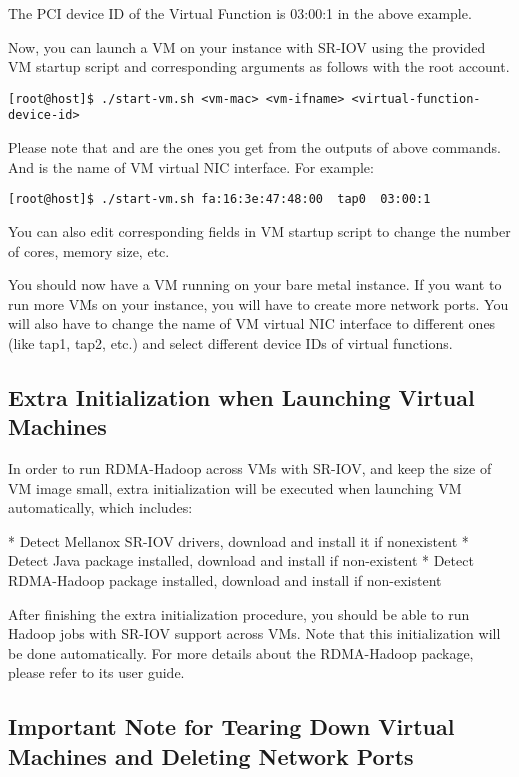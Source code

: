 The PCI device ID of the Virtual Function is 03:00:1 in the above example.

Now, you can launch a VM on your instance with SR-IOV using the provided VM startup script and corresponding arguments as follows with the root account.

\begin{verbatim}
[root@host]$ ./start-vm.sh <vm-mac> <vm-ifname> <virtual-function-device-id>
\end{verbatim}

Please note that and are the ones you get from the outputs of above
commands. And is the name of VM virtual NIC interface. For example:

\begin{verbatim}
[root@host]$ ./start-vm.sh fa:16:3e:47:48:00  tap0  03:00:1
\end{verbatim}

You can also edit corresponding fields in VM startup script to change
the number of cores, memory size, etc.

You should now have a VM running on your bare metal instance. If you
want to run more VMs on your instance, you will have to create more
network ports. You will also have to change the name of VM virtual NIC
interface to different ones (like tap1, tap2, etc.) and select
different device IDs of virtual functions.

\subsection{Extra Initialization when Launching Virtual Machines}

In order to run RDMA-Hadoop across VMs with SR-IOV, and keep the size
of VM image small, extra initialization will be executed when
launching VM automatically, which includes:

* Detect Mellanox SR-IOV drivers, download and install it if nonexistent
* Detect Java package installed, download and install if non-existent
* Detect RDMA-Hadoop package installed, download and install if non-existent

After finishing the extra initialization procedure, you should be able
to run Hadoop jobs with SR-IOV support across VMs. Note that this
initialization will be done automatically. For more details about the
RDMA-Hadoop package, please refer to its user guide.

\subsection{Important Note for Tearing Down Virtual Machines and Deleting Network Ports}


